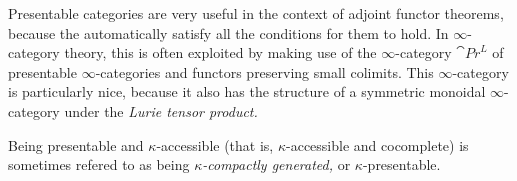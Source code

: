 Presentable categories are very useful in the context of adjoint functor theorems, because the automatically satisfy all the conditions for them to hold. In \(\infty\)-category theory,
this is often exploited by making use of the \(\infty\)-category \(\cat{Pr}^L\) of presentable \(\infty\)-categories and functors preserving small colimits. This \(\infty\)-category
is particularly nice, because it also has the structure of a symmetric monoidal \(\infty\)-category under the \emph{Lurie tensor product.}

Being presentable and \(\kappa\)-accessible (that is, \(\kappa\)-accessible and cocomplete) is sometimes refered to as being \(\kappa\)\emph{-compactly generated,} or \(\kappa\)-presentable.
